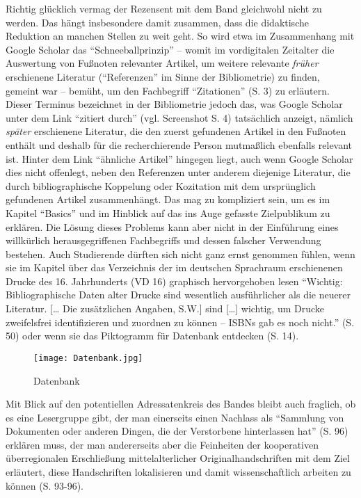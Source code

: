 \documentclass[a4paper,
fontsize=11pt,
oneside,
numbers=noperiodatend,
parskip=half-,
bibliography=totoc,
final
]{scrartcl}
\begin{document}
Richtig glücklich vermag der Rezensent mit dem Band gleichwohl nicht zu
werden. Das hängt insbesondere damit zusammen, dass die didaktische
Reduktion an manchen Stellen zu weit geht. So wird etwa im Zusammenhang
mit Google Scholar das \enquote{Schneeballprinzip} -- womit im
vordigitalen Zeitalter die Auswertung von Fußnoten relevanter Artikel,
um weitere relevante \emph{früher} erschienene Literatur
(\enquote{Referenzen} im Sinne der Bibliometrie) zu finden, gemeint war
-- bemüht, um den Fachbegriff \enquote{Zitationen} (S. 3) zu erläutern.
Dieser Terminus bezeichnet in der Bibliometrie jedoch das, was Google
Scholar unter dem Link \enquote{zitiert durch} (vgl. Screenshot S. 4)
tatsächlich anzeigt, nämlich \emph{später} erschienene Literatur, die
den zuerst gefundenen Artikel in den Fußnoten enthält und deshalb für
die recherchierende Person mutmaßlich ebenfalls relevant ist. Hinter dem
Link \enquote{ähnliche Artikel} hingegen liegt, auch wenn Google Scholar
dies nicht offenlegt, neben den Referenzen unter anderem diejenige
Literatur, die durch bibliographische Koppelung oder Kozitation mit dem
ursprünglich gefundenen Artikel zusammenhängt. Das mag zu kompliziert
sein, um es im Kapitel \enquote{Basics} und im Hinblick auf das ins Auge
gefasste Zielpublikum zu erklären. Die Lösung dieses Problems kann aber
nicht in der Einführung eines willkürlich herausgegriffenen Fachbegriffs
und dessen falscher Verwendung bestehen. Auch Studierende dürften sich
nicht ganz ernst genommen fühlen, wenn sie im Kapitel über das
Verzeichnis der im deutschen Sprachraum erschienenen Drucke des 16.
Jahrhunderts (VD 16) graphisch hervorgehoben lesen \enquote{Wichtig:
Bibliographische Daten alter Drucke sind wesentlich ausführlicher als
die neuerer Literatur. {[}\ldots{} Die zusätzlichen Angaben, S.W.{]}
sind {[}\ldots{}{]} wichtig, um Drucke zweifelsfrei identifizieren und
zuordnen zu können -- ISBNs gab es noch nicht.} (S. 50) oder wenn sie
das Piktogramm für Datenbank entdecken (S. 14).

\begin{figure}[htbp]
\centering
\texttt{[image: Datenbank.jpg]}
\caption{Datenbank}
\end{figure}

Mit Blick auf den potentiellen Adressatenkreis des Bandes bleibt auch
fraglich, ob es eine Lesergruppe gibt, der man einerseits einen Nachlass
als \enquote{Sammlung von Dokumenten oder anderen Dingen, die der
Verstorbene hinterlassen hat} (S. 96) erklären muss, der man
andererseits aber die Feinheiten der kooperativen überregionalen
Erschließung mittelalterlicher Originalhandschriften mit dem Ziel
erläutert, diese Handschriften lokalisieren und damit wissenschaftlich
arbeiten zu können (S. 93-96).
\end{document}
